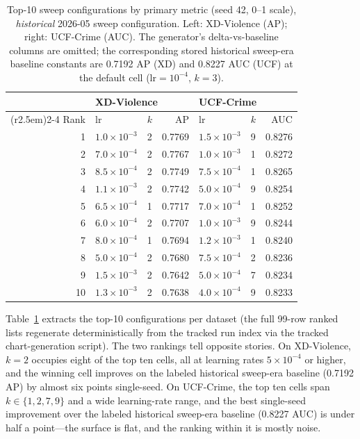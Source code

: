 \begin{table}[t]
\centering
\caption{Top-10 sweep configurations by primary metric (seed 42, 0--1
scale), \emph{historical} 2026-05 sweep configuration. Left: XD-Violence
(AP); right: UCF-Crime (AUC). The generator's delta-vs-baseline columns are
omitted; the corresponding stored historical sweep-era baseline constants
are 0.7192 AP (XD) and 0.8227 AUC (UCF) at the default cell
($\mathrm{lr}=10^{-4}$, $k=3$).}
\label{tab:appc-ranked}
\begin{tabular}{rllr@{\hspace{2.5em}}llr}
\toprule
 & \multicolumn{3}{l}{XD-Violence} & \multicolumn{3}{l}{UCF-Crime} \\
\cmidrule(r{2.5em}){2-4} \cmidrule{5-7}
Rank & lr & $k$ & AP & lr & $k$ & AUC \\
\midrule
1  & $1.0\times10^{-3}$ & 2 & 0.7769 & $1.5\times10^{-3}$ & 9 & 0.8276 \\
2  & $7.0\times10^{-4}$ & 2 & 0.7767 & $1.0\times10^{-3}$ & 1 & 0.8272 \\
3  & $8.5\times10^{-4}$ & 2 & 0.7749 & $7.5\times10^{-4}$ & 1 & 0.8265 \\
4  & $1.1\times10^{-3}$ & 2 & 0.7742 & $5.0\times10^{-4}$ & 9 & 0.8254 \\
5  & $6.5\times10^{-4}$ & 1 & 0.7717 & $7.0\times10^{-4}$ & 1 & 0.8252 \\
6  & $6.0\times10^{-4}$ & 2 & 0.7707 & $1.0\times10^{-3}$ & 9 & 0.8244 \\
7  & $8.0\times10^{-4}$ & 1 & 0.7694 & $1.2\times10^{-3}$ & 1 & 0.8240 \\
8  & $5.0\times10^{-4}$ & 2 & 0.7680 & $7.5\times10^{-4}$ & 2 & 0.8236 \\
9  & $1.5\times10^{-3}$ & 2 & 0.7642 & $5.0\times10^{-4}$ & 7 & 0.8234 \\
10 & $1.3\times10^{-3}$ & 2 & 0.7638 & $4.0\times10^{-4}$ & 9 & 0.8233 \\
\bottomrule
\end{tabular}
\end{table}

Table~\ref{tab:appc-ranked} extracts the top-10 configurations per dataset
(the full 99-row ranked lists regenerate deterministically from the tracked
run index via the tracked chart-generation script). The two rankings tell
opposite stories. On XD-Violence, $k=2$ occupies eight of the top ten
cells, all at learning rates $5\times10^{-4}$ or higher, and the winning
cell improves on the labeled historical sweep-era baseline (0.7192 AP) by
almost six points single-seed. On UCF-Crime, the top ten cells span
$k \in \{1, 2, 7, 9\}$ and a wide learning-rate range, and the best
single-seed improvement over the labeled historical sweep-era baseline
(0.8227 AUC) is under half a point---the surface is flat, and the ranking
within it is mostly noise.

